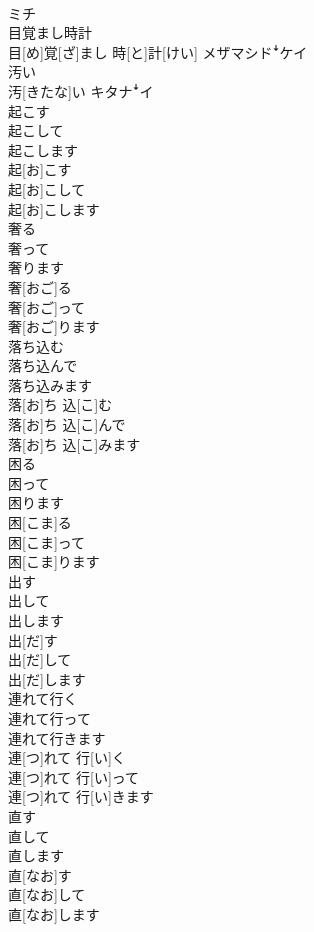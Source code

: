 \documentclass[8pt]{extreport}
\begin{document}
\begin{CJK}{UTF8}{min}
\\	ミチ
\\	目覚まし時計	
\\	目[め]覚[ざ]まし 時[と]計[けい]	メザマシドꜜケイ
\\	汚い	
\\	汚[きたな]い	キタナꜜイ
\\	起こす 
\\	起こして 
\\	起こします	
\\	起[お]こす 
\\	起[お]こして 
\\	起[お]こします	
\\	奢る 
\\	奢って 
\\	奢ります	
\\	奢[おご]る 
\\	奢[おご]って 
\\	奢[おご]ります	
\\	落ち込む 
\\	落ち込んで 
\\	落ち込みます	
\\	落[お]ち 込[こ]む 
\\	落[お]ち 込[こ]んで 
\\	落[お]ち 込[こ]みます	
\\	困る 
\\	困って 
\\	困ります	
\\	困[こま]る 
\\	困[こま]って 
\\	困[こま]ります	
\\	出す 
\\	出して 
\\	出します	
\\	出[だ]す 
\\	出[だ]して 
\\	出[だ]します	
\\	連れて行く 
\\	連れて行って 
\\	連れて行きます	
\\	連[つ]れて 行[い]く 
\\	連[つ]れて 行[い]って 
\\	連[つ]れて 行[い]きます	
\\	直す 
\\	直して 
\\	直します	
\\	直[なお]す 
\\	直[なお]して 
\\	直[なお]します	

\end{CJK}
\end{document}
